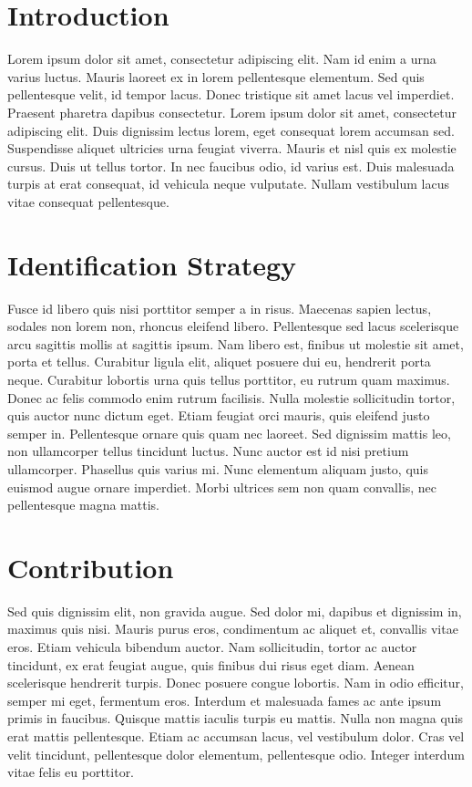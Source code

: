 \documentclass[11.5pt, twoside]{article}         %
\begin{document}

\tsection

\section{Introduction}
Lorem ipsum dolor sit amet, consectetur adipiscing elit. Nam id enim a urna varius luctus. Mauris laoreet ex in lorem pellentesque elementum. Sed quis pellentesque velit, id tempor lacus. Donec tristique sit amet lacus vel imperdiet. Praesent pharetra dapibus consectetur. Lorem ipsum dolor sit amet, consectetur adipiscing elit. Duis dignissim lectus lorem, eget consequat lorem accumsan sed. Suspendisse aliquet ultricies urna feugiat viverra. Mauris et nisl quis ex molestie cursus. Duis ut tellus tortor. In nec faucibus odio, id varius est. Duis malesuada turpis at erat consequat, id vehicula neque vulputate. Nullam vestibulum lacus vitae consequat pellentesque.

\section{Identification Strategy}
Fusce id libero quis nisi porttitor semper a in risus. Maecenas sapien lectus, sodales non lorem non, rhoncus eleifend libero. Pellentesque sed lacus scelerisque arcu sagittis mollis at sagittis ipsum. Nam libero est, finibus ut molestie sit amet, porta et tellus. Curabitur ligula elit, aliquet posuere dui eu, hendrerit porta neque. Curabitur lobortis urna quis tellus porttitor, eu rutrum quam maximus. Donec ac felis commodo enim rutrum facilisis. Nulla molestie sollicitudin tortor, quis auctor nunc dictum eget. Etiam feugiat orci mauris, quis eleifend justo semper in. Pellentesque ornare quis quam nec laoreet. Sed dignissim mattis leo, non ullamcorper tellus tincidunt luctus. Nunc auctor est id nisi pretium ullamcorper. Phasellus quis varius mi. Nunc elementum aliquam justo, quis euismod augue ornare imperdiet. Morbi ultrices sem non quam convallis, nec pellentesque magna mattis.

\section{Contribution}
Sed quis dignissim elit, non gravida augue. Sed dolor mi, dapibus et dignissim in, maximus quis nisi. Mauris purus eros, condimentum ac aliquet et, convallis vitae eros. Etiam vehicula bibendum auctor. Nam sollicitudin, tortor ac auctor tincidunt, ex erat feugiat augue, quis finibus dui risus eget diam. Aenean scelerisque hendrerit turpis. Donec posuere congue lobortis. Nam in odio efficitur, semper mi eget, fermentum eros. Interdum et malesuada fames ac ante ipsum primis in faucibus. Quisque mattis iaculis turpis eu mattis. Nulla non magna quis erat mattis pellentesque. Etiam ac accumsan lacus, vel vestibulum dolor. Cras vel velit tincidunt, pellentesque dolor elementum, pellentesque odio. Integer interdum vitae felis eu porttitor.

\end{document}
